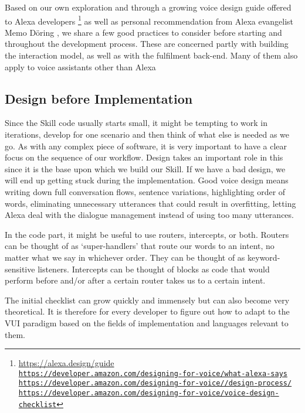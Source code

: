 Based on our own exploration and through a growing voice design guide offered to Alexa developers \footnote{\url{https://alexa.design/guide} \\ \href{https://developer.amazon.com/designing-for-voice/what-alexa-says/}{\lstinline|https://developer.amazon.com/designing-for-voice/what-alexa-says|}\\
	\href{https://developer.amazon.com/designing-for-voice/design-process/}{\lstinline|https://developer.amazon.com/designing-for-voice//design-process/|}\\
	\href{https://developer.amazon.com/designing-for-voice/voice-design-checklist}{\lstinline|https://developer.amazon.com/designing-for-voice/voice-design-checklist|}
} as well as personal recommendation from Alexa evangelist Memo Döring \cite{memo:devDay}, we share a few good practices to consider before starting and throughout the development process. These are concerned partly with building the interaction model, as well as with the fulfilment back-end. Many of them also apply to voice assistants other than Alexa






\subsection*{Design before Implementation}
Since the Skill code usually starts small, it might be tempting to work in iterations, develop for one scenario and then think of what else is needed as we go.
As with any complex piece of software, it is very important to have a clear focus on the sequence of our workflow. Design takes an important role in this since it is the base upon which we build our Skill. If we have a bad design, we will end up getting stuck during the implementation. Good voice design means writing down full conversation flows, sentence variations, highlighting order of words, eliminating unnecessary utterances that could result in overfitting, letting Alexa deal with the dialogue management instead of using too many utterances.

In the code part, it might be useful to use routers, intercepts, or both.
Routers can be thought of as `super-handlers' that route our words to an intent, no matter what we say in whichever order. They can be thought of as keyword-sensitive listeners. Intercepts can be thought of blocks as code that would perform before and/or after a certain router takes us to a certain intent.

The initial checklist can grow quickly and immensely but can also become very theoretical. It is therefore for every developer to figure out how to adapt to the VUI paradigm based on the fields of implementation and languages relevant to them. %



